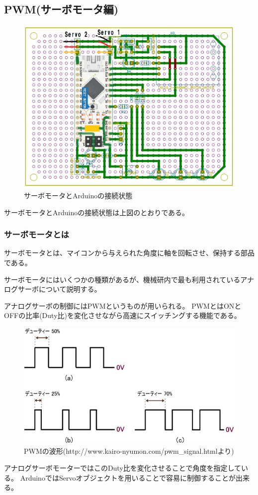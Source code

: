 \documentclass[uplatex]{jsarticle}
\begin{document}
\subsection{PWM(サーボモータ編)}
\begin{figure}[htbp]
    \centering
    \includegraphics[width=15cm]{servo_pwm.png}
    \caption{サーボモータとArduinoの接続状態}
\end{figure}
サーボモータとArduinoの接続状態は上図のとおりである。
\subsubsection{サーボモータとは}
サーボモータとは、マイコンから与えられた角度に軸を回転させ、保持する部品である。

サーボモータにはいくつかの種類があるが、機械研内で最も利用されているアナログサーボについて説明する。

アナログサーボの制御にはPWMというものが用いられる。
PWMとはONとOFFの比率(Duty比)を変化させながら高速にスイッチングする機能である。
\begin{figure}[htbp]
    \centering
    \includegraphics[width=12cm]{pwm_2.png}
    \caption{PWMの波形(http://www.kairo-nyumon.com/pwm\_signal.htmlより)}
\end{figure}
アナログサーボモーターではこのDuty比を変化させることで角度を指定している。
ArduinoではServoオブジェクトを用いることで容易に制御することが出来る。
\end{document}
